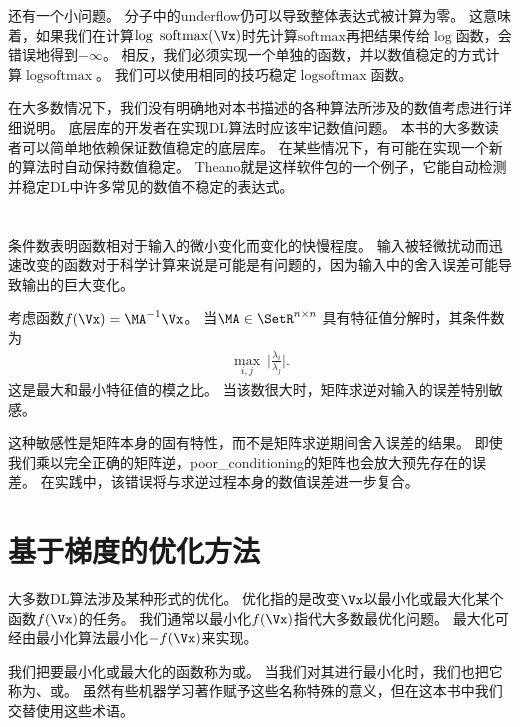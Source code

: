 还有一个小问题。
分子中的\gls{underflow}仍可以导致整体表达式被计算为零。
这意味着，如果我们在计算$\log ~\text{softmax}(\Vx)$时先计算$\text{softmax}$再把结果传给$\log$函数，会错误地得到$-\infty$。
相反，我们必须实现一个单独的函数，并以数值稳定的方式计算$\log \text{softmax}$。
我们可以使用相同的技巧稳定$\log \text{softmax}$函数。

在大多数情况下，我们没有明确地对本书描述的各种算法所涉及的数值考虑进行详细说明。
底层库的开发者在实现\gls{DL}算法时应该牢记数值问题。
本书的大多数读者可以简单地依赖保证数值稳定的底层库。
在某些情况下，有可能在实现一个新的算法时自动保持数值稳定。
Theano\citep{bergstra+al:2010-scipy,Bastien-2012}就是这样软件包的一个例子，它能自动检测并稳定\gls{DL}中许多常见的数值不稳定的表达式。


\section{}
\label{sec:poor_conditioning}

条件数表明函数相对于输入的微小变化而变化的快慢程度。
输入被轻微扰动而迅速改变的函数对于科学计算来说是可能是有问题的，因为输入中的舍入误差可能导致输出的巨大变化。

考虑函数$f(\Vx) = \MA^{-1} \Vx$。
当$\MA \in \SetR^{n \times n}$ 具有特征值分解时，其条件数为
\begin{align}
 \underset{i,j}{\max}~ \Bigg| \frac{\lambda_i}{ \lambda_j} \Bigg|.
\end{align}
这是最大和最小特征值的模之比。
当该数很大时，矩阵求逆对输入的误差特别敏感。

这种敏感性是矩阵本身的固有特性，而不是矩阵求逆期间舍入误差的结果。
即使我们乘以完全正确的矩阵逆，\gls{poor_conditioning}的矩阵也会放大预先存在的误差。
在实践中，该错误将与求逆过程本身的数值误差进一步复合。



\section{基于梯度的优化方法}
\label{sec:gradient_based_optimization}

大多数\gls{DL}算法涉及某种形式的优化。
优化指的是改变$\Vx$以最小化或最大化某个函数$f(\Vx)$的任务。
我们通常以最小化$f(\Vx)$指代大多数最优化问题。
最大化可经由最小化算法最小化$-f(\Vx)$来实现。

我们把要最小化或最大化的函数称为或。
当我们对其进行最小化时，我们也把它称为、或。
虽然有些机器学习著作赋予这些名称特殊的意义，但在这本书中我们交替使用这些术语。

